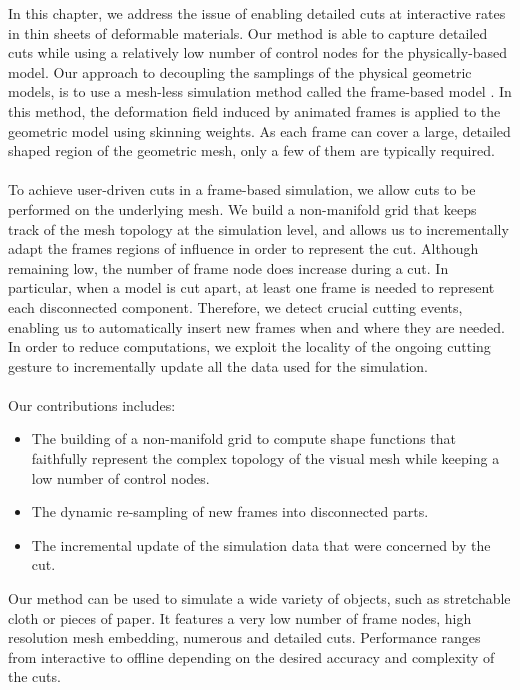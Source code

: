In this chapter, we address the issue of enabling detailed cuts at interactive rates in  thin sheets of deformable materials. Our method is able to capture detailed cuts while using a relatively low number of control nodes for the physically-based model.
Our approach to decoupling the samplings of the physical geometric models, is to use a mesh-less simulation method called the frame-based model \cite{Gilles2011}. In this method, the deformation field induced by animated frames is applied to the geometric model using skinning weights. As each frame can cover a large, detailed shaped region of the geometric mesh, only a few of them are typically required.
\\ \\
To achieve user-driven cuts in a frame-based simulation, we allow cuts to be performed on the underlying mesh.
We build a non-manifold grid that keeps track of the mesh topology at the simulation level, and allows us to incrementally adapt the frames regions of influence in order to  represent the cut.
Although remaining low, the number of frame node does increase during a cut. In particular, when a model is cut apart, at least one frame is needed to represent each disconnected component. 
Therefore, we detect crucial cutting events, enabling us to automatically insert new frames when and where they are needed.
In order to reduce computations, we exploit the locality of the ongoing cutting gesture to incrementally update all the data used for the simulation.
\\ \\
Our contributions includes:
\begin{itemize}
\item The building of a non-manifold grid to compute shape functions that faithfully represent the  complex topology of the visual mesh while keeping a low number of control nodes.
\item The dynamic re-sampling of new frames into disconnected parts.
\item The incremental update of the simulation data that were concerned by the cut.
\end{itemize}
Our method can be used to simulate a wide variety of objects, such as stretchable cloth or pieces of paper. It features a very low number of frame nodes, high resolution mesh embedding, numerous and detailed cuts. Performance ranges from interactive to offline depending on the desired accuracy and complexity of the cuts.


